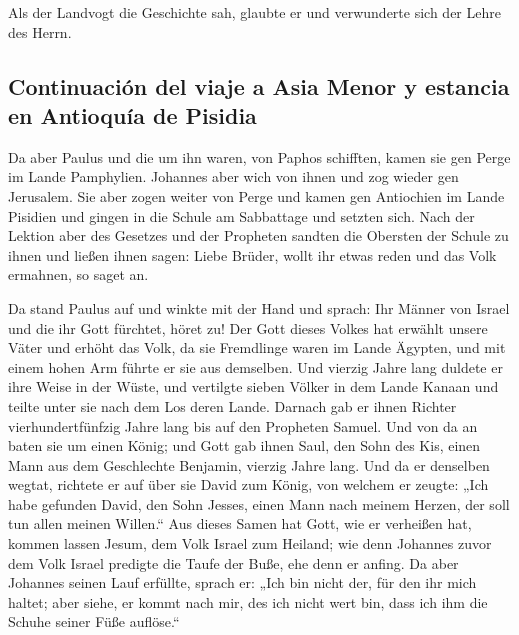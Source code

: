  Als der Landvogt die Geschichte sah, glaubte er und
verwunderte sich der Lehre des Herrn.

\hypertarget{continuaciuxf3n-del-viaje-a-asia-menor-y-estancia-en-antioquuxeda-de-pisidia}{%
\subsection{Continuación del viaje a Asia Menor y estancia en Antioquía
de
Pisidia}\label{continuaciuxf3n-del-viaje-a-asia-menor-y-estancia-en-antioquuxeda-de-pisidia}}

 Da aber Paulus und die um ihn waren, von Paphos
schifften, kamen sie gen Perge im Lande Pamphylien. Johannes aber wich
von ihnen und zog wieder gen Jerusalem.  Sie aber zogen
weiter von Perge und kamen gen Antiochien im Lande Pisidien und gingen
in die Schule am Sabbattage und setzten sich.  Nach der
Lektion aber des Gesetzes und der Propheten sandten die Obersten der
Schule zu ihnen und ließen ihnen sagen: Liebe Brüder, wollt ihr etwas
reden und das Volk ermahnen, so saget an.

 Da stand Paulus auf und winkte mit der Hand und sprach:
Ihr Männer von Israel und die ihr Gott fürchtet, höret zu!
 Der Gott dieses Volkes hat erwählt unsere Väter und
erhöht das Volk, da sie Fremdlinge waren im Lande Ägypten, und mit einem
hohen Arm führte er sie aus demselben.  Und vierzig Jahre
lang duldete er ihre Weise in der Wüste,  und vertilgte
sieben Völker in dem Lande Kanaan und teilte unter sie nach dem Los
deren Lande.  Darnach gab er ihnen Richter
vierhundertfünfzig Jahre lang bis auf den Propheten Samuel.
 Und von da an baten sie um einen König; und Gott gab
ihnen Saul, den Sohn des Kis, einen Mann aus dem Geschlechte Benjamin,
vierzig Jahre lang.  Und da er denselben wegtat, richtete
er auf über sie David zum König, von welchem er zeugte: „Ich habe
gefunden David, den Sohn Jesses, einen Mann nach meinem Herzen, der soll
tun allen meinen Willen.``  Aus dieses Samen hat Gott,
wie er verheißen hat, kommen lassen Jesum, dem Volk Israel zum Heiland;
 wie denn Johannes zuvor dem Volk Israel predigte die
Taufe der Buße, ehe denn er anfing.  Da aber Johannes
seinen Lauf erfüllte, sprach er: „Ich bin nicht der, für den ihr mich
haltet; aber siehe, er kommt nach mir, des ich nicht wert bin, dass ich
ihm die Schuhe seiner Füße auflöse.``

